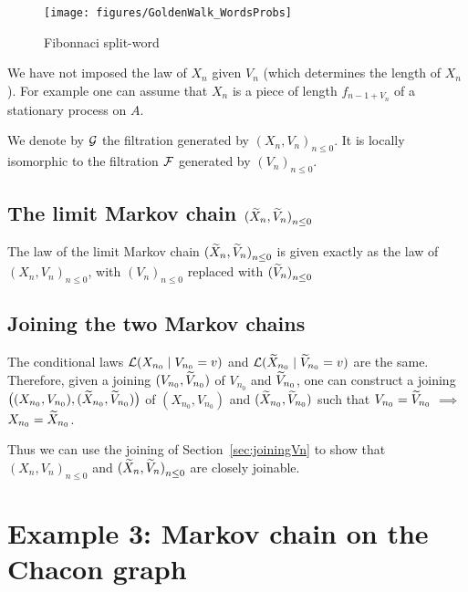 \documentclass[12pt,a4paper]{article}
\begin{document}
\begin{figure}[!h]
\centering
	\texttt{[image: figures/GoldenWalk\_WordsProbs]}
\caption{Fibonnaci split-word}\label{fig:fibosw}
\end{figure}

We have not imposed the law of $X_n$ given $V_n$ (which determines 
the length of $X_n$). 
For example one can assume that $X_n$ is a piece of length $f_{n-1+V_n}$ of 
a stationary process on $A$. 

We denote by $\mathcal{G}$ the filtration generated by ${(X_n, V_n)}_{n \leq 0}$. 
It is locally isomorphic to the filtration $\mathcal{F}$ generated by ${(V_n)}_{n \leq 0}$.

\subsection{The limit Markov chain ${(\widetilde{X}_n, \widetilde{V}_n)}_{n \leq 0}$}

The law of the limit Markov chain ${(\widetilde{X}_n, \widetilde{V}_n)}_{n \leq 0}$ 
is given exactly as the law of ${(X_n, V_n)}_{n \leq 0}$, 
with ${(V_n)}_{n \leq 0}$ replaced with ${(\widetilde{V}_n)}_{n \leq 0}$


\subsection{Joining the two Markov chains}

The conditional laws $\mathcal{L}(X_{n_0} \mid V_{n_0}=v)$ and 
$\mathcal{L}(\widetilde{X}_{n_0} \mid \widetilde{V}_{n_0}=v)$ are the same. 
Therefore, given a joining $(V_{n_0}, \widetilde{V}_{n_0})$ of $V_{n_0}$ and $\widetilde{V}_{n_0}$, 
one can construct a joining 
$\bigl((X_{n_0}, V_{n_0}), (\widetilde{X}_{n_0}, \widetilde{V}_{n_0})\bigr)$ 
of $(X_{n_0}, V_{n_0})$ and $(\widetilde{X}_{n_0}, \widetilde{V}_{n_0})$ such that 
$V_{n_0} = \widetilde{V}_{n_0}$ $\implies$ $X_{n_0}=\widetilde{X}_{n_0}$. 

Thus we can use the joining of Section~\ref{sec:joiningVn} to show 
that ${(X_n, V_n)}_{n \leq 0}$ and ${(\widetilde{X}_n, \widetilde{V}_n)}_{n \leq 0}$ 
are closely joinable. 


\section{Example 3: Markov chain on the Chacon graph}
\end{document}
